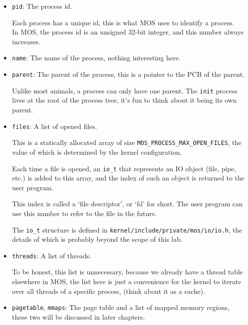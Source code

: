 \begin{itemize}
    \item \texttt{pid}: The process id.

          Each process has a unique id, this is what MOS uses to identify a process.\\
          In MOS, the process id is an unsigned 32-bit integer, and this number always
          increases.

    \item \texttt{name}: The name of the process, nothing interesting here.

    \item \texttt{parent}: The parent of the process, this is a pointer to the PCB of the parent.

          Unlike most animals, a process can only have one parent. The \texttt{init}
          process lives at the root of the process tree, it's fun to think about it being its own
          parent.

    \item \texttt{files}: A list of opened files.

          This is a statically allocated array of size \texttt{MOS\_PROCESS\_MAX\_OPEN\_FILES},
          the value of which is determined by the kernel configuration.

          Each time a file is opened, an \texttt{io\_t} that represents an IO object (file, pipe, etc.)
          is added to this array, and the index of such an object is returned to the user program.

          This index is called a `file descriptor', or `fd' for short. The user program can use
          this number to refer to the file in the future.

          The \texttt{io\_t} structure is defined in \texttt{kernel/include/private/mos/io/io.h},
          the details of which is probably beyond the scope of this lab.

    \item \texttt{threads}: A list of threads.

          To be honest, this list is unnecessary, because we already have a thread table elsewhere
          in MOS, the list here is just a convenience for the kernel to iterate over all threads
          of a specific process, (think about it as a cache).

    \item \texttt{pagetable}, \texttt{mmaps}: The page table and a list of mapped memory regions,
          these two will be discussed in later chapters.
\end{itemize}

